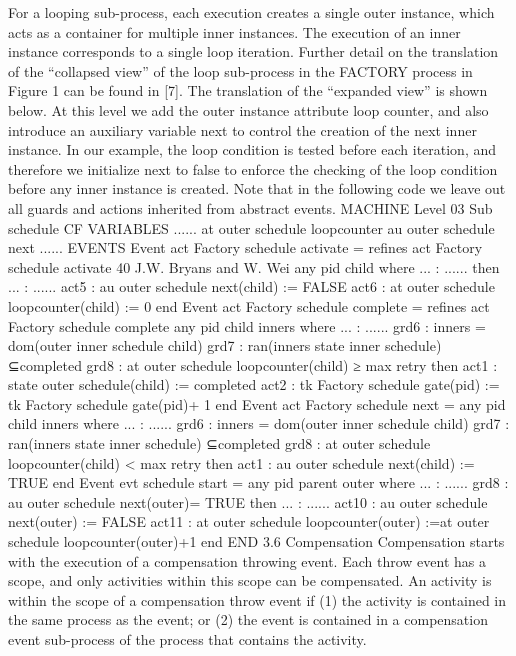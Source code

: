 For a looping sub-process, each execution creates a single outer instance, which
acts as a container for multiple inner instances. The execution of an inner
instance corresponds to a single loop iteration. Further detail on the translation
of the “collapsed view” of the loop sub-process in the FACTORY process in Figure
1 can be found in [7].
The translation of the “expanded view” is shown below. At this level we
add the outer instance attribute loop counter, and also introduce an auxiliary
variable next to control the creation of the next inner instance. In our example,
the loop condition is tested before each iteration, and therefore we initialize next
to false to enforce the checking of the loop condition before any inner instance
is created. Note that in the following code we leave out all guards and actions
inherited from abstract events.
MACHINE Level 03 Sub schedule CF
VARIABLES
......
at outer schedule loopcounter
au outer schedule next
...... EVENTS
Event act Factory schedule activate = refines act Factory schedule activate
40 J.W. Bryans and W. Wei
any
pid
child
where
... : ...... then
... : ......
act5 : au outer schedule next(child) := FALSE
act6 : at outer schedule loopcounter(child) := 0
end
Event act Factory schedule complete = refines act Factory schedule complete
any
pid
child
inners
where
... : ......
grd6 : inners = dom(outer inner schedule  {child})
grd7 : ran(inners  state inner schedule) ⊆{completed}
grd8 : at outer schedule loopcounter(child) ≥ max retry then
act1 : state outer schedule(child) := completed
act2 : tk Factory schedule gate(pid) := tk Factory schedule gate(pid)+ 1
end
Event act Factory schedule next =
any
pid
child
inners
where
... : ......
grd6 : inners = dom(outer inner schedule  {child})
grd7 : ran(inners  state inner schedule) ⊆{completed}
grd8 : at outer schedule loopcounter(child) < max retry then
act1 : au outer schedule next(child) := TRUE
end
Event evt schedule start =
any
pid
parent
outer where
... : ......
grd8 : au outer schedule next(outer)= TRUE
then
... : ......
act10 : au outer schedule next(outer) := FALSE
act11 : at outer schedule loopcounter(outer) :=at outer schedule loopcounter(outer)+1
end
END
3.6 Compensation
Compensation starts with the execution of a compensation throwing event. Each
throw event has a scope, and only activities within this scope can be compensated. An activity is within the scope of a compensation throw event if (1) the
activity is contained in the same process as the event; or (2) the event is contained in a compensation event sub-process of the process that contains the
activity.
